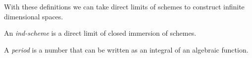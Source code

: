     
    With these definitions we can take direct limits of schemes to construct infinite dimensional spaces.
    \begin{defn}
    An \emph{ind-scheme} is a direct limit of closed immersion of schemes. 
    \end{defn}


    \begin{defn}[Period] A \emph{period} is a number that can be written as an integral of an algebraic function.
    \end{defn}